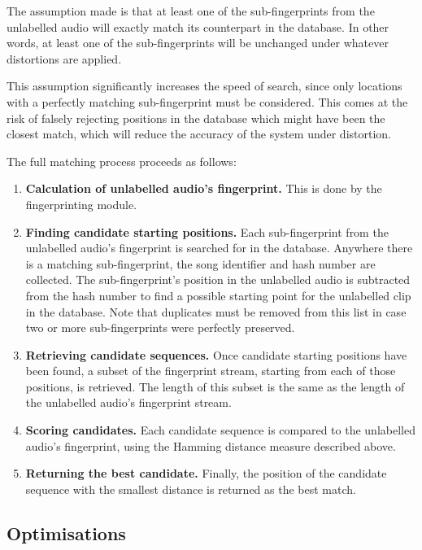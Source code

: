 \documentclass[12pt,a4paper,twoside,openright]{report}
\begin{document}
The assumption made is that at least one of the sub-fingerprints from the unlabelled audio will exactly match its counterpart in the database. In other words, at least one of the sub-fingerprints will be unchanged under whatever distortions are applied.

This assumption significantly increases the speed of search, since only locations with a perfectly matching sub-fingerprint must be considered. This comes at the risk of falsely rejecting positions in the database which might have been the closest match, which will reduce the accuracy of the system under distortion.

The full matching process proceeds as follows:

\begin{enumerate}

  \item \textbf{Calculation of unlabelled audio's fingerprint.} This is done by the fingerprinting module.

  \item \textbf{Finding candidate starting positions.} Each sub-fingerprint from the unlabelled audio's fingerprint is searched for in the database. Anywhere there is a matching sub-fingerprint, the song identifier and hash number are collected. The sub-fingerprint's position in the unlabelled audio is subtracted from the hash number to find a possible starting point for the unlabelled clip in the database. Note that duplicates must be removed from this list in case two or more sub-fingerprints were perfectly preserved.

  \item \textbf{Retrieving candidate sequences.} Once candidate starting positions have been found, a subset of the fingerprint stream, starting from each of those positions, is retrieved. The length of this subset is the same as the length of the unlabelled audio's fingerprint stream.

  \item \textbf{Scoring candidates.} Each candidate sequence is compared to the unlabelled audio's fingerprint, using the Hamming distance measure described above.

  \item \textbf{Returning the best candidate.} Finally, the position of the candidate sequence with the smallest distance is returned as the best match.

\end{enumerate}

\subsection{Optimisations}
\end{document}

